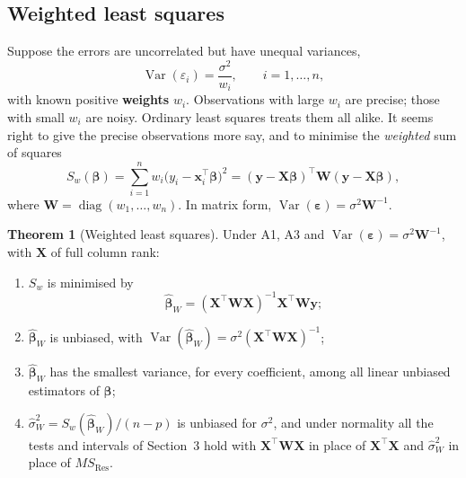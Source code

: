 \documentclass[11pt,a4paper]{article}
\numberwithin{equation}{section}
\theoremstyle{definition}
\newtheorem{thm}{Theorem}[subsection]
\begin{document}
\subsection{Weighted least squares}
Suppose the errors are uncorrelated but have unequal variances,
\[
\operatorname{Var}(\varepsilon_i) = \frac{\sigma^2}{w_i} , \qquad i = 1, \dots, n ,
\]
with known positive \textbf{weights} $w_i$. Observations with large $w_i$ are precise; those
with small $w_i$ are noisy. Ordinary least squares treats them all alike. It seems right to
give the precise observations more say, and to minimise the \emph{weighted} sum of squares
\[
S_w(\boldsymbol\beta) = \sum_{i=1}^n w_i\bigl(y_i - \mathbf{x}_i^\top\boldsymbol\beta\bigr)^2
= (\mathbf{y} - \mathbf{X}\boldsymbol\beta)^\top\mathbf{W}(\mathbf{y} - \mathbf{X}\boldsymbol\beta) ,
\]
where $\mathbf{W} = \operatorname{diag}(w_1, \dots, w_n)$. In matrix form,
$\operatorname{Var}(\boldsymbol\varepsilon) = \sigma^2\mathbf{W}^{-1}$.

\begin{thm}[Weighted least squares]\label{thm:wls}
Under A1, A3 and $\operatorname{Var}(\boldsymbol\varepsilon) = \sigma^2\mathbf{W}^{-1}$, with $\mathbf{X}$ of full
column rank:
\begin{enumerate}[label=(\roman*)]
\item $S_w$ is minimised by
\[
\hat{\boldsymbol\beta}_W = (\mathbf{X}^\top\mathbf{W}\mathbf{X})^{-1}\mathbf{X}^\top\mathbf{W}\mathbf{y} ;
\]
\item $\hat{\boldsymbol\beta}_W$ is unbiased, with $\operatorname{Var}(\hat{\boldsymbol\beta}_W) = \sigma^2(\mathbf{X}^\top\mathbf{W}\mathbf{X})^{-1}$;
\item $\hat{\boldsymbol\beta}_W$ has the smallest variance, for every coefficient, among all
linear unbiased estimators of $\boldsymbol\beta$;
\item $\hat\sigma^2_W = S_w(\hat{\boldsymbol\beta}_W)/(n - p)$ is unbiased for $\sigma^2$, and under normality all
the tests and intervals of Section~3 hold with $\mathbf{X}^\top\mathbf{W}\mathbf{X}$ in place of
$\mathbf{X}^\top\mathbf{X}$ and $\hat\sigma^2_W$ in place of $MS_{\mathrm{Res}}$.
\end{enumerate}
\end{thm}
\end{document}
